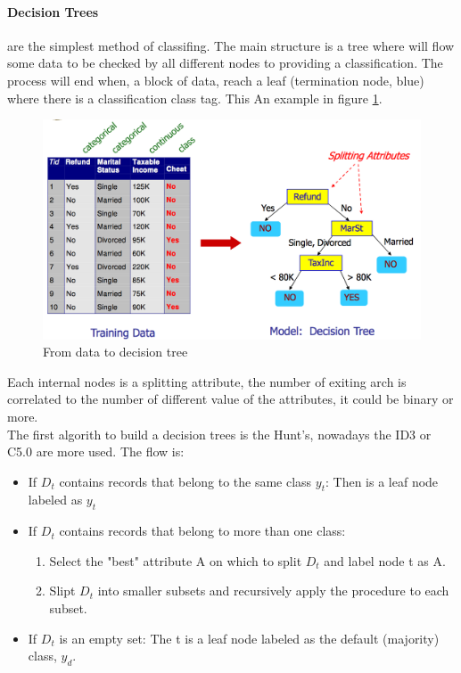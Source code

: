 \documentclass[12pt]{article}
\begin{document}
\paragraph{Decision Trees} are the simplest method of classifing. The main structure is a tree where will flow some data to be checked by all different nodes to providing a classification. The process will end when, a block of data, reach a leaf (termination node, blue) where there is a classification class tag. This  An example in figure \ref{fig:dt}.
\begin{figure}[h!]
  \includegraphics[width=\linewidth]{images/dt.png}
  \caption{From data to decision tree}
  \label{fig:dt}
\end{figure}
Each internal nodes is a splitting attribute, the number of exiting arch is correlated to the number of different value of the attributes, it could be binary or more.\\
The first algorith to build a decision trees is the Hunt's, nowadays the ID3 or C5.0 are more used. The flow is:
\begin{itemize}
  \item If $D_t$ contains records that belong to the same class $y_t$: Then is a leaf node labeled as $y_t$
  \item If $D_t$ contains records that belong to more than one class:
  \begin{enumerate}
    \item Select the "best" attribute A on which to split $D_t$ and label node t as A.
    \item Slipt $D_t$ into smaller subsets and recursively apply the procedure to each subset.
  \end{enumerate}
  \item If $D_t$ is an empty set: The t is a leaf node labeled as the default (majority) class, $y_d$.
\end{itemize}
\end{document}
